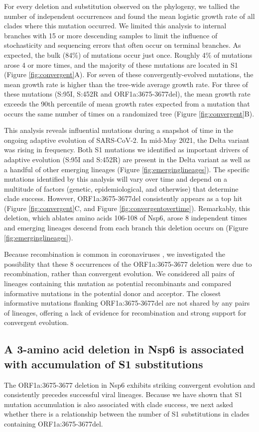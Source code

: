 \documentclass[11pt,oneside,letterpaper]{article}
\begin{document}
For every deletion and substitution observed on the phylogeny, we tallied the number of independent occurrences and found the mean logistic growth rate of all clades where this mutation occurred.
We limited this analysis to internal branches with 15 or more descending samples to limit the influence of stochasticity and sequencing errors that often occur on terminal branches. 
As expected, the bulk (84\%) of mutations occur just once.
Roughly 4\% of mutations arose 4 or more times, and the majority of these mutations are located in S1 (Figure \ref{fig:convergent}A).
For seven of these convergently-evolved mutations, the mean growth rate is higher than the tree-wide average growth rate.
For three of these mutations (S:95I, S:452R and ORF1a:3675-3677del), the mean growth rate exceeds the 90th percentile of mean growth rates expected from a mutation that occurs the same number of times on a randomized tree (Figure \ref{fig:convergent}B).

This analysis reveals influential mutations during a snapshot of time in the ongoing adaptive evolution of SARS-CoV-2.
In mid-May 2021, the Delta variant was rising in frequency.
Both S1 mutations we identified as important drivers of adaptive evolution (S:95I and S:452R) are present in the Delta variant as well as a handful of other emerging lineages (Figure \ref{fig:emerginglineages}).
The specific mutations identified by this analysis will vary over time and depend on a multitude of factors (genetic, epidemiological, and otherwise) that determine clade success.
However, ORF1a:3675-3677del consistently appears as a top hit (Figure \ref{fig:convergent}C, and Figure \ref{fig:convergentovertime}).
Remarkably, this deletion, which ablates amino acids 106-108 of Nsp6, arose 8 independent times and emerging lineages descend from each branch this deletion occurs on (Figure \ref{fig:emerginglineages}).

Because recombination is common in coronaviruses \cite{Muller2021-qq, Turkahia2021-ao}, we investigated the possibility that these 8 occurrences of the ORF1a:3675-3677 deletion were due to recombination, rather than convergent evolution.
We considered all pairs of lineages containing this mutation as potential recombinants and compared informative mutations in the potential donor and acceptor.
The closest informative mutations flanking ORF1a:3675-3677del are not shared by any pairs of lineages, offering a lack of evidence for recombination and strong support for convergent evolution.

\subsection*{A 3-amino acid deletion in Nsp6 is associated with accumulation of S1 substitutions}
The ORF1a:3675-3677 deletion in Nsp6 exhibits striking convergent evolution and consistently precedes successful viral lineages. Because we have shown that S1 mutation accumulation is also associated with clade success, we next asked whether there is a relationship between the number of S1 substitutions in clades containing ORF1a:3675-3677del.
\end{document}
